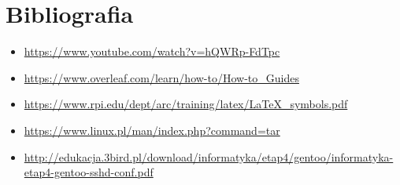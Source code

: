 \documentclass[12pt]{article}
\begin{document}
\section*{Bibliografia}
\begin{itemize}
    \item \url{https://www.youtube.com/watch?v=hQWRp-FdTpc}
    \item \url{https://www.overleaf.com/learn/how-to/How-to_Guides}
    \item \url{https://www.rpi.edu/dept/arc/training/latex/LaTeX_symbols.pdf}
    \item \url{https://www.linux.pl/man/index.php?command=tar}
    \item \url{http://edukacja.3bird.pl/download/informatyka/etap4/gentoo/informatyka-etap4-gentoo-sshd-conf.pdf}
\end{itemize}
\end{document}
